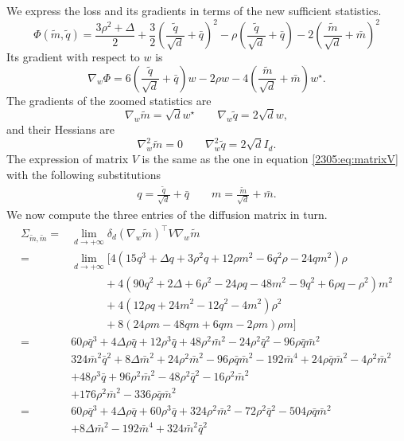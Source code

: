 We express the loss and its gradients in terms of the new sufficient statistics.
\[\Phi(\tilde m, \tilde q) = \frac{3\rho^2+\Delta}{2} + \frac{3}{2} \left(\frac{\tilde q}{\sqrt{d}}+\bar q\right)^2 - \rho \left(\frac{\tilde q}{\sqrt{d}}+\bar q\right) - 2\left(\frac{\tilde m}{\sqrt{d}}+\bar m\right)^2\]
Its gradient with respect to \(w\) is
\[
    \nabla_w\Phi = 6 \left(\frac{\tilde q}{\sqrt{d}}+\bar q\right) w-2\rho w-4\left(\frac{\tilde m}{\sqrt{d}}+\bar m\right)w^\star.
\]
The gradients of the zoomed statistics are
\[
    \nabla_w \tilde m = \sqrt{d} w^\star \qquad \nabla_w \tilde q = 2\sqrt{d}w,
\]
and their Hessians are
\[
    \nabla^2_w \tilde m = 0 \qquad \nabla^2_w \tilde q = 2\sqrt{d}I_d.
\]
The expression of matrix \(V\) is the same as the one in equation \eqref{2305:eq:matrixV} with the following substitutions
\[\begin{split}
    q = \frac{\tilde q}{\sqrt{d}} + \bar q \qquad
    m = \frac{\tilde m}{\sqrt{d}} + \bar m.
\end{split}\]
We now compute the three entries of the diffusion matrix in turn.
\[\begin{split}
 \Sigma_{\tilde m, \tilde m} =&  \lim_{d\to+\infty} \delta_d (\nabla_w{\tilde m})^\top V \nabla_w{\tilde m}  \\ 
 =& \lim_{d\to+\infty}\Big[4(15q^3+\Delta q+3\rho^2q+12\rho m^2-6q^2\rho-24qm^2)\rho \\
 &\qquad\quad + 4(90q^2+2\Delta+6\rho^2-24\rho q -48m^2-9q^2+6\rho q-\rho^2)m^2 \\
 &\qquad\quad +4(12\rho q + 24m^2-12q^2-4m^2)\rho^2 \\
 &\qquad\quad +8(24\rho m-48qm+6qm-2\rho m)\rho m \Big] \\
 =& 60\rho \bar q^3+4\Delta \rho \bar q+12\rho^3\bar q+48\rho^2 \bar m^2-24\rho^2 \bar q^2-96\rho \bar q\bar m^2 \\
 &324 \bar m^2 \bar q^2 + 8\Delta\bar m^2+24\rho^2\bar m^2 -96\rho \bar q \bar m^2 -192\bar m^4+24 \rho \bar q \bar m^2-4 \rho^2\bar m^2 \\
 & +48\rho^3 \bar q + 96\rho^2\bar m^2-48\rho^2\bar q^2-16\rho^2\bar m^2 \\
 & +176\rho^2 \bar m^2-336\rho \bar q \bar m^2 \\
 =& 60\rho \bar q^3+4\Delta \rho \bar q+60\rho^3\bar q+324\rho^2 \bar m^2-72\rho^2 \bar q^2-504\rho \bar q\bar m^2 \\
 & + 8\Delta\bar m^2 -192\bar m^4+324\bar m^2 \bar q^2
\end{split}\]

